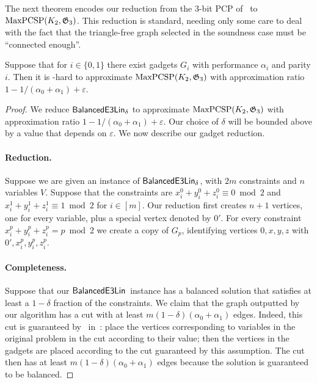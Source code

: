 \documentclass[a4paper,11pt, DIV=11]{scrartcl}
\renewcommand{\epsilon}{\varepsilon}
\renewcommand{\G}{\ensuremath{\mathfrak{G}}}
\DeclareMathOperator{\belin}{\textnormal{\textsf{BalancedE3Lin}}}
\DeclareMathOperator{\maxPCSP}{\textup{MaxPCSP}}
\theoremstyle{plain}
\theoremstyle{definition}
\begin{document}
The next theorem encodes our reduction from 
the 3-bit PCP of~\cite{Hastad01} to $\maxPCSP(K_2, \G_3)$. This reduction is standard, needing only some care to deal with the fact that the triangle-free graph selected in the soundness case must be ``connected enough''.

\begin{theorem}
    Suppose that for $i \in \{0, 1\}$ there exist gadgets $G_i$ with performance $\alpha_i$ and parity $i$. Then it is \NP-hard to approximate $\maxPCSP(K_2, \G_3)$  with approximation ratio $1 - 1 / (\alpha_0 + \alpha_1) + \epsilon$.
\end{theorem}
\begin{proof}
    We reduce $\belin_\delta$
    to approximate 
    $\maxPCSP(K_2, \G_3)$ with approximation ratio $1 - 1 / (\alpha_0 + \alpha_1) + \epsilon$. Our choice of $\delta$ will be bounded above by a value that depends on $\epsilon$. We now describe our gadget reduction.

    \paragraph{Reduction.} Suppose we are given an instance of $\belin_{\delta}$, with $2m$ constraints and $n$ variables $V$. Suppose that the constraints are $x_i^0 + y_i^0 + z_i^0 \equiv 0 \bmod 2$ and $x_i^1 + y_i^1 + z_i^1 \equiv 1 \bmod 2$ for $i \in [m]$.
     Our reduction first creates $n + 1$ vertices, one for every variable, plus a special vertex denoted by $0'$. For every constraint $x_i^p + y_i^p + z_i^p = p \bmod 2$ we create a copy of $G_{p}$, identifying vertices $0, x, y, z$ with $0', x_i^p, y_i^p, z_i^p$.

    \paragraph{Completeness.} Suppose that our $\belin{}$ instance has a balanced solution that satisfies at least a $1 - \delta$ fraction of the constraints. We claim that the graph outputted by our algorithm has a cut with at least $m (1 - \delta) (\alpha_0 + \alpha_1)$ edges. Indeed, this cut is guaranteed by~ in~: place the vertices corresponding to variables in the original problem in the cut according to their value; then the vertices in the gadgets are placed according to the cut guaranteed by this assumption. The cut then has at least $m(1 - \delta)(\alpha_0 + \alpha_1)$ edges because the solution is guaranteed to be balanced.


\end{proof}
\end{document}
